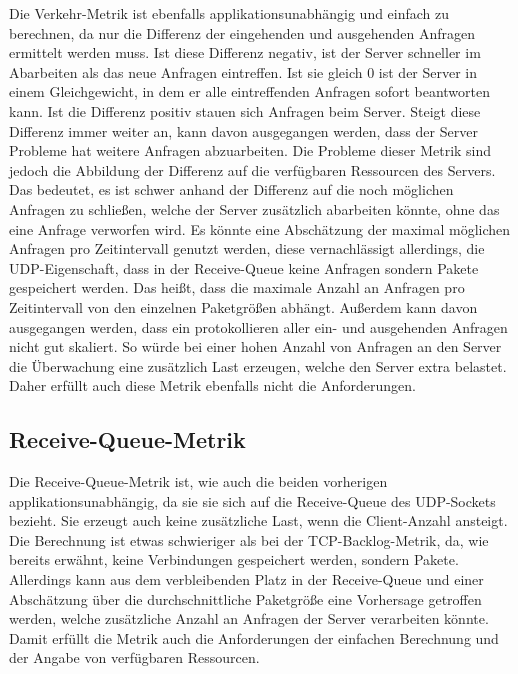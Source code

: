 \documentclass[a4paper, 12pt, BCOR10mm, DIV12, toc=bibliography, toc=listof, german]{scrbook}
\begin{document}
		Die Verkehr-Metrik ist ebenfalls applikationsunabhängig und einfach zu berechnen, da nur die
		Differenz der eingehenden und ausgehenden Anfragen ermittelt werden muss. Ist diese Differenz
		negativ, ist der Server schneller im Abarbeiten als das neue Anfragen eintreffen. Ist sie gleich
		0 ist der Server in einem Gleichgewicht, in dem er alle eintreffenden Anfragen sofort
		beantworten kann.  Ist die Differenz positiv stauen sich Anfragen beim Server. Steigt diese
		Differenz immer weiter an, kann davon ausgegangen werden, dass der Server Probleme hat weitere
		Anfragen abzuarbeiten. Die Probleme dieser Metrik sind jedoch die Abbildung der Differenz auf
		die verfügbaren Ressourcen des Servers. Das bedeutet, es ist schwer anhand der Differenz auf die
		noch möglichen Anfragen zu schließen, welche der Server zusätzlich abarbeiten könnte, ohne das
		eine Anfrage verworfen wird. Es könnte eine Abschätzung der maximal möglichen Anfragen pro
		Zeitintervall genutzt werden, diese vernachlässigt allerdings, die UDP-Eigenschaft, dass in der
		Receive-Queue keine Anfragen sondern Pakete gespeichert werden. Das heißt, dass die maximale
		Anzahl an Anfragen pro Zeitintervall von den einzelnen Paketgrößen abhängt. Außerdem
		kann davon ausgegangen werden, dass ein protokollieren aller ein- und ausgehenden Anfragen nicht
		gut skaliert. So würde bei einer hohen Anzahl von Anfragen an den Server die Überwachung
		eine zusätzlich Last erzeugen, welche den Server extra belastet. Daher erfüllt auch diese Metrik
		ebenfalls nicht die Anforderungen.


		\subsection*{Receive-Queue-Metrik} %

		Die Receive-Queue-Metrik ist, wie auch die beiden vorherigen applikationsunabhängig, da sie sie
		sich auf die Receive-Queue des UDP-Sockets bezieht. Sie erzeugt auch keine zusätzliche Last,
		wenn die Client-Anzahl ansteigt. Die Berechnung ist etwas schwieriger als bei der
		TCP-Backlog-Metrik, da, wie bereits erwähnt, keine Verbindungen gespeichert werden, sondern
		Pakete. Allerdings kann aus dem verbleibenden Platz in der Receive-Queue und einer Abschätzung
		über die durchschnittliche Paketgröße eine Vorhersage getroffen werden, welche zusätzliche
		Anzahl an Anfragen der Server verarbeiten könnte. Damit erfüllt die Metrik auch die
		Anforderungen der einfachen Berechnung und der Angabe von verfügbaren Ressourcen.
\end{document}

